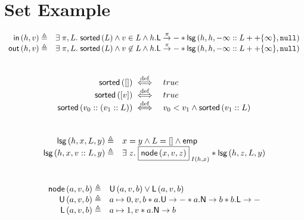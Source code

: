 \newpage
\section*{Set Example}
\[
\begin{array}{r l}
	\inSet{h}{v} \eqdef & \exsts{\pi, L} \sorted{L} \land v \in L \land \lockT{h}[\pi] * \lsg{h}{h}{-\infty:: L ++\{\infty\} }{\nil}\\

	\outSet{h}{v} \eqdef & \exsts{\pi, L} \sorted{L} \land v \not\in L \land \lockT{h}[\pi] * \lsg{h}{h}{-\infty:: L ++ \{\infty\} }{\nil}
\end{array}
\]\\
%
%
\[
\begin{array}{r l}
	\textsf{sorted}\left([]\right) \stackrel{\mathrm{def}}{\iff} & true\\
	\textsf{sorted}\left([v]\right) \stackrel{\mathrm{def}}{\iff} & true\\
	\textsf{sorted}\left(v_0 :: (v_1:: L)\right) \stackrel{\mathrm{def}}{\iff} & v_0 < v_1 \land \textsf{sorted}\left(v_1:: L\right)
\end{array}
\]\\
%
%
\[
\begin{array}{r l}
	
	\textsf{lsg}\left(h, x, L, y\right) \triangleq & x = y \land L = [] \land \textsf{emp}\\
	\textsf{lsg}\left(h, x, v:: L, y\right) \triangleq & \exists\; z.\; \boxed{\textsf{node}\left(x, v, z\right)}_{\; I(h, x)} * \textsf{lsg}\left(h, z, L, y\right)
\end{array}
\]\\
%
%
\[	
\begin{array}{r l}
	\node{a}{v}{b} \eqdef & \unlockedNode{a}{v}{b} \lor \lockedNode{a}{v}{b}\\
	\unlockedNode{a}{v}{b} \eqdef & \cell{a}{0, v, b} * \unlockT{a} * \nextT{a}{b} * \lockT{b}\\
	\lockedNode{a}{v}{b} \eqdef & \cell{a}{1, v} * \nextT{a}{b}
\end{array}
\]\\
%
%
